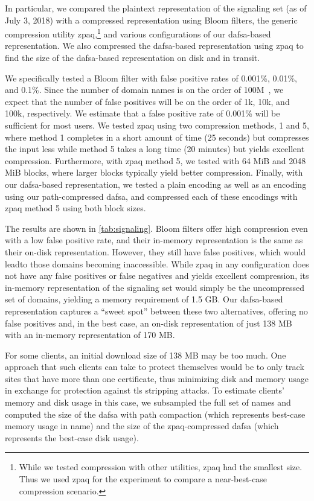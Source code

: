 In particular, we compared the plaintext representation of the signaling set (as
of July 3, 2018) with a compressed representation using Bloom filters, the
generic compression utility zpaq,\footnote{While we tested compression with other
  utilities, zpaq had the smallest size. Thus we used zpaq for the experiment to
  compare a near-best-case compression scenario.} and various configurations of
our \ac{dafsa}-based representation. We also compressed the \ac{dafsa}-based
representation using zpaq to find the size of the \ac{dafsa}-based
representation on disk and in transit. 

We specifically tested a Bloom filter with false positive rates of 0.001\%,
0.01\%, and 0.1\%. Since the number of domain names is on the order of
100M~\cite{dnib-14-1}, we expect that the number of false positives will be on
the order of 1k, 10k, and 100k, respectively. We estimate that a false positive
rate of 0.001\% will be sufficient for most users. We tested zpaq using two
compression methods, 1 and 5, where method 1 completes in a short amount of time
(25 seconds) but compresses the input less while method 5 takes a long time (20
minutes) but yields excellent compression. Furthermore, with zpaq method 5, we
tested with 64 MiB and 2048 MiB blocks, where larger blocks typically yield
better compression. Finally, with our \ac{dafsa}-based representation, 
we tested a plain encoding as
well as an encoding using our path-compressed \ac{dafsa}, and compressed each of
these encodings with zpaq method 5 using both block sizes.

The results are shown in \autoref{tab:signaling}. Bloom filters offer high
compression even with a low false positive rate, and their in-memory
representation is the same as their on-disk representation. However, they still
have false positives, which would leadto those domains becoming inaccessible.
While zpaq in any configuration does not have any false positives or false
negatives and yields excellent compression, its in-memory representation of the
signaling set would simply be the uncompressed set of domains, yielding a memory
requirement of 1.5 GB. Our \ac{dafsa}-based representation captures a ``sweet
spot'' between these two alternatives, offering no false positives and, in the
best case, an on-disk representation of just 138 MB with an in-memory
representation of 170 MB.

For some clients, an initial download size of 138 MB may be too much. One
approach that such clients can take to protect themselves would be to only track
sites that have more than one certificate, thus minimizing disk and memory usage
in exchange for protection against \ac{tls} stripping attacks. To estimate
clients' memory and disk usage in this case, we subsampled the full set of names
and computed the size of the \ac{dafsa} with path compaction (which represents
best-case memory usage in \ac{name}) and the size of the zpaq-compressed
\ac{dafsa} (which represents the best-case disk usage).

